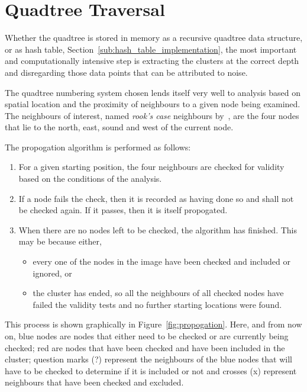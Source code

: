 
\section{Quadtree Traversal}
\label{sec:quadtree_traversal}

Whether the quadtree is stored in memory as a recursive quadtree data
structure, or as hash table, Section~\ref{sub:hash_table_implementation}, the
most important and computationally intensive step is extracting the clusters at
the correct depth and disregarding those data points that can be attributed to
noise.

The quadtree numbering system chosen lends itself very well to analysis based
on spatial location and the proximity of neighbours to a given node being
examined. The neighbours of interest, named \emph{rook's case} neighbours
by~\cite{abel1990comparative}, are the four nodes that lie to the north, east,
sound and west of the current node.

The propogation algorithm is performed as follows:
\begin{enumerate}
	\item For a given starting position, the four neighbours are checked for
	validity based on the conditions of the analysis.
	\item If a node fails the check, then it is recorded as having done so and
	shall not be checked again. If it passes, then it is itself propogated.
	\item When there are no nodes left to be checked, the algorithm has
	finished. This may be because either,
	\begin{itemize}
		\item every one of the nodes in the image have been checked and
		included or ignored, or
		\item the cluster has ended, so all the neighbours of all checked nodes
		have failed the validity tests and no further starting locations were
		found.
	\end{itemize}
\end{enumerate}

This process is shown graphically in Figure~\ref{fig:propogation}. Here, and
from now on, blue nodes are nodes that either need to be checked or are
currently being checked; red are nodes that have been checked and have been
included in the cluster; question marks ({\footnotesize?}) represent the
neighbours of the blue nodes that will have to be checked to determine if it is
included or not and crosses ({\footnotesize x}) represent neighbours that have
been checked and excluded.


